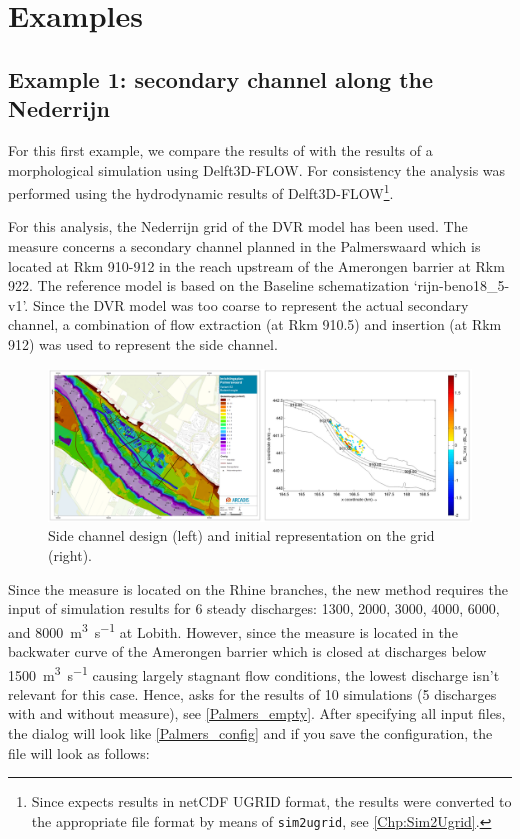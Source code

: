 \chapter{Examples}

\section{Example 1: secondary channel along the Nederrijn}

For this first example, we compare the results of \dfastmi with the results of a morphological simulation using Delft3D-FLOW.
For consistency the \dfastmi analysis was performed using the hydrodynamic results of Delft3D-FLOW\footnote{Since \dfastmi expects \dflowfm results in netCDF UGRID format, the results were converted to the appropriate file format by means of \texttt{sim2ugrid}, see \autoref{Chp:Sim2Ugrid}.}.

For this analysis, the Nederrijn grid of the DVR model has been used.
The measure concerns a secondary channel planned in the Palmerswaard which is located at Rkm 910-912 in the reach upstream of the Amerongen barrier at Rkm 922.
The reference model is based on the Baseline schematization ‘rijn-beno18\_5-v1’.
Since the DVR model was too coarse to represent the actual secondary channel, a combination of flow extraction (at Rkm 910.5) and insertion (at Rkm 912) was used to represent the side channel.

\begin{figure}
\includegraphics[width=\columnwidth]{figures/Palmerswaard_proj.png}
\caption{Side channel design (left) and initial representation on the grid (right).}
\label{Palmers_proj}
\end{figure}

Since the measure is located on the Rhine branches, the new \dfastmi method requires the input of simulation results for 6 steady discharges: 1300, 2000, 3000, 4000, 6000, and \SI{8000}{\metre\cubed\per\second} at Lobith.
However, since the measure is located in the backwater curve of the Amerongen barrier which is closed at discharges below \SI{1500}{\metre\cubed\per\second} causing largely stagnant flow conditions, the lowest discharge isn't relevant for this case.
Hence, \dfmi asks for the results of 10 simulations (5 discharges with and without measure), see \autoref{Palmers_empty}.
After specifying all input files, the dialog will look like \autoref{Palmers_config} and if you save the configuration, the file will look as follows:

